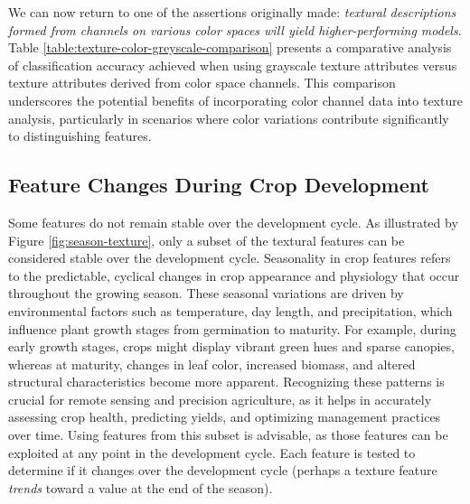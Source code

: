 \documentclass[letterpaper]{report}
\begin{document}
We can now return to one of the assertions originally made: \textit{textural descriptions formed from channels on various color spaces will yield higher-performing models}. Table \ref{table:texture-color-greyscale-comparison} presents a comparative analysis of classification accuracy achieved when using grayscale texture attributes versus texture attributes derived from color space channels. This comparison underscores the potential benefits of incorporating color channel data into texture analysis, particularly in scenarios where color variations contribute significantly to distinguishing features. 
{
\renewcommand{\arraystretch}{0.9}

%
%

}



\subsection{Feature Changes During Crop Development}
Some features do not remain stable over the development cycle. As illustrated by Figure \ref{fig:season-texture}, only a subset of the textural features can be considered stable over the development cycle. Seasonality in crop features refers to the predictable, cyclical changes in crop appearance and physiology that occur throughout the growing season. These seasonal variations are driven by environmental factors such as temperature, day length, and precipitation, which influence plant growth stages from germination to maturity. For example, during early growth stages, crops might display vibrant green hues and sparse canopies, whereas at maturity, changes in leaf color, increased biomass, and altered structural characteristics become more apparent. Recognizing these patterns is crucial for remote sensing and precision agriculture, as it helps in accurately assessing crop health, predicting yields, and optimizing management practices over time. Using features from this subset is advisable, as those features can be exploited at any point in the development cycle.  Each feature is tested to determine if it changes over the development cycle (perhaps a texture feature \textit{trends} toward a value at the end of the season).
\end{document}
